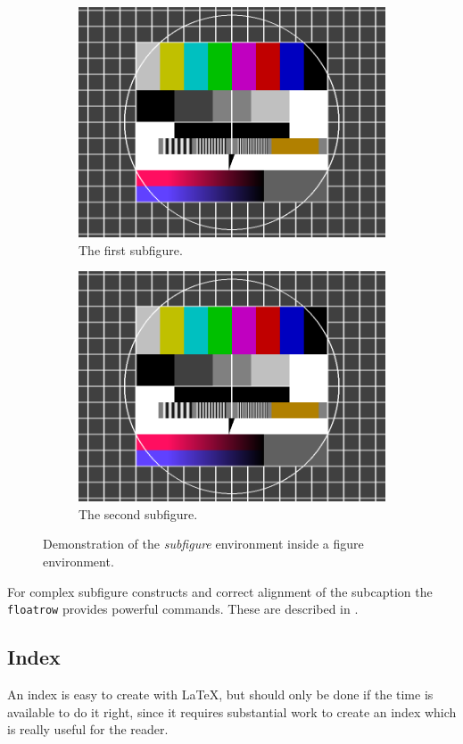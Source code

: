 \begin{figure}[htb]
  \begin{subfigure}[b]{.45\linewidth}
    \centering
    \includegraphics[width=0.5\linewidth]{images/testimage.png}
    \caption{The first subfigure.}
    \label{fig:example:subfigures:a}
  \end{subfigure}%
  \begin{subfigure}[b]{.45\linewidth}
    \centering
    \includegraphics[width=0.5\linewidth]{images/testimage.png}
    \caption{The second subfigure.}
    \label{fig:example:subfigures:b}
  \end{subfigure}
  \caption{Demonstration of the \emph{subfigure} environment inside a figure environment.}
  \label{fig:example:subfigures}
\end{figure}

For complex subfigure constructs and correct alignment of the subcaption the \texttt{floatrow} provides powerful commands. These are described in .

\subsection{Index}
\label{sec:example:index}

An index is easy to create with LaTeX, but should only be done if the time is available to do it right, since it requires substantial work to create an index which is really useful for the reader.

